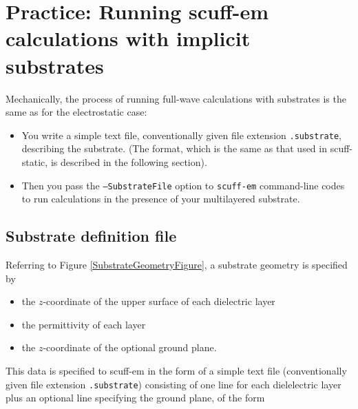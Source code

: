 \documentclass[letterpaper]{article}
\begin{document}
\newpage
\section{Practice: Running {\sc scuff-em} calculations
         with implicit substrates}
\label{MechanicsSection}

Mechanically, the process of running full-wave calculations
with substrates is the same as for the electrostatic case:

\begin{itemize}
  \item You write a simple text file, conventionally given
        file extension \texttt{.substrate}, describing the
        substrate. (The format, which is the same as that 
        used in {\sc scuff-static}, is described in the 
        following section).
  \item Then you pass the \texttt{--SubstrateFile} option to
        \texttt{scuff-em} command-line codes to run calculations
        in the presence of your multilayered substrate.
\end{itemize}

\subsection{Substrate definition file}

Referring to Figure \ref{SubstrateGeometryFigure},
a substrate geometry is specified by
\begin{itemize}
 \item the $z$-coordinate of the upper surface of each dielectric layer
 \item the permittivity of each layer
 \item the $z$-coordinate of the optional ground plane.
\end{itemize}

This data is specified to {\sc scuff-em} in the
form of a simple text file (conventionally given file
extension \texttt{.substrate}) consisting of one line for each
dielelectric layer plus an optional line specifying the ground 
plane, of the form
\end{document}
